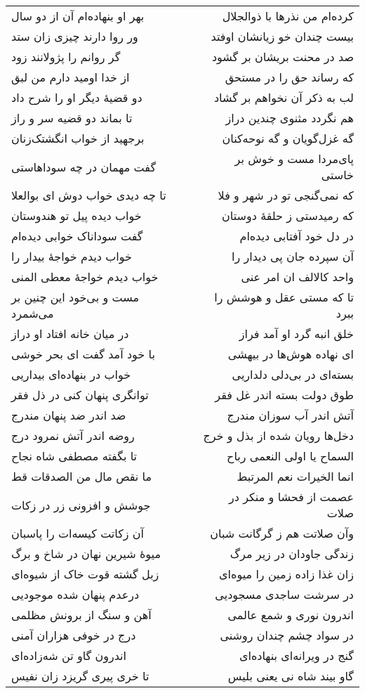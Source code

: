 \begin{center}
\begin{longtable}{l p{0.5cm} r}
بهر او بنهاده‌ام آن از دو سال
&&
کرده‌ام من نذرها با ذوالجلال
\\
ور روا دارند چیزی زان ستد
&&
بیست چندان خو زیانشان اوفتد
\\
گر روانم را پژولانند زود
&&
صد در محنت بریشان بر گشود
\\
از خدا اومید دارم من لبق
&&
که رساند حق را در مستحق
\\
دو قضیهٔ دیگر او را شرح داد
&&
لب به ذکر آن نخواهم بر گشاد
\\
تا بماند دو قضیه سر و راز
&&
هم نگردد مثنوی چندین دراز
\\
برجهید از خواب انگشتک‌زنان
&&
گه غزل‌گویان و گه نوحه‌کنان
\\
گفت مهمان در چه سوداهاستی
&&
پای‌مردا مست و خوش بر خاستی
\\
تا چه دیدی خواب دوش ای بوالعلا
&&
که نمی‌گنجی تو در شهر و فلا
\\
خواب دیده پیل تو هندوستان
&&
که رمیدستی ز حلقهٔ دوستان
\\
گفت سوداناک خوابی دیده‌ام
&&
در دل خود آفتابی دیده‌ام
\\
خواب دیدم خواجهٔ بیدار را
&&
آن سپرده جان پی دیدار را
\\
خواب دیدم خواجهٔ معطی المنی
&&
واحد کالالف ان امر عنی
\\
مست و بی‌خود این چنین بر می‌شمرد
&&
تا که مستی عقل و هوشش را ببرد
\\
در میان خانه افتاد او دراز
&&
خلق انبه گرد او آمد فراز
\\
با خود آمد گفت ای بحر خوشی
&&
ای نهاده هوش‌ها در بیهشی
\\
خواب در بنهاده‌ای بیداریی
&&
بسته‌ای در بی‌دلی دلداریی
\\
توانگری پنهان کنی در ذل فقر
&&
طوق دولت بسته اندر غل فقر
\\
ضد اندر ضد پنهان مندرج
&&
آتش اندر آب سوزان مندرج
\\
روضه اندر آتش نمرود درج
&&
دخل‌ها رویان شده از بذل و خرج
\\
تا بگفته مصطفی شاه نجاح
&&
السماح یا اولی النعمی رباح
\\
ما نقص مال من الصدقات قط
&&
انما الخیرات نعم المرتبط
\\
جوشش و افزونی زر در زکات
&&
عصمت از فحشا و منکر در صلات
\\
آن زکاتت کیسه‌ات را پاسبان
&&
وآن صلاتت هم ز گرگانت شبان
\\
میوهٔ شیرین نهان در شاخ و برگ
&&
زندگی جاودان در زیر مرگ
\\
زبل گشته قوت خاک از شیوه‌ای
&&
زان غذا زاده زمین را میوه‌ای
\\
درعدم پنهان شده موجودیی
&&
در سرشت ساجدی مسجودیی
\\
آهن و سنگ از برونش مظلمی
&&
اندرون نوری و شمع عالمی
\\
درج در خوفی هزاران آمنی
&&
در سواد چشم چندان روشنی
\\
اندرون گاو تن شه‌زاده‌ای
&&
گنج در ویرانه‌ای بنهاده‌ای
\\
تا خری پیری گریزد زان نفیس
&&
گاو بیند شاه نی یعنی بلیس
\\
\end{longtable}
\end{center}
